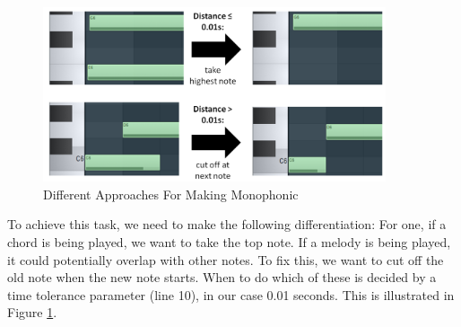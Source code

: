 \documentclass[a4paper,12pt]{extarticle}
\begin{document}
\begin{figure}[H] %
    \centering
    \includegraphics[width=0.9\textwidth]{monophonic.png} %
    \caption{Different Approaches For Making Monophonic}
    \label{fig:mon}
\end{figure}

To achieve this task, we need to make the following differentiation: For one, if a chord is being played, we want to take the top note. If a melody is being played, it could potentially overlap with other notes. To fix this, we want to cut off the old note when the new note starts. When to do which of these is decided by a time tolerance parameter (line 10), in our case 0.01 seconds. This is illustrated in Figure \ref{fig:mon}. \newline
\end{document}
